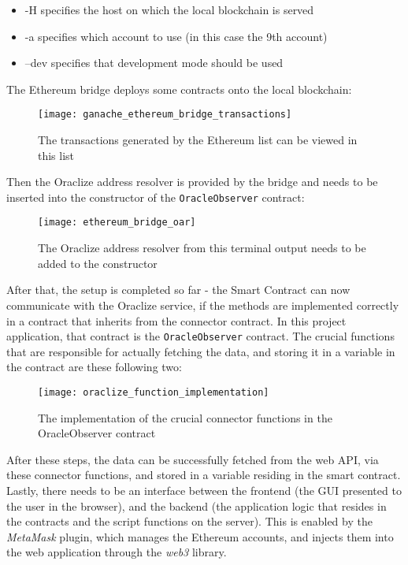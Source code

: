 \begin{itemize}
	\item -H specifies the host on which the local blockchain is served
	\item -a specifies which account to use (in this case the 9th account)
	\item --dev specifies that development mode should be used
\end{itemize}
The Ethereum bridge deploys some contracts onto the local blockchain:
\begin{figure}[H]
\centering
\texttt{[image: ganache\_ethereum\_bridge\_transactions]}
\caption{The transactions generated by the Ethereum list can be viewed in this list}
\end{figure}
Then the Oraclize address resolver is provided by the bridge and needs to be inserted into the constructor of the \texttt{OracleObserver} contract:
\begin{figure}[H]
\centering
\texttt{[image: ethereum\_bridge\_oar]}
\caption{The Oraclize address resolver from this terminal output needs to be added to the constructor}
\end{figure}
After that, the setup is completed so far - the Smart Contract can now communicate with the Oraclize service, if the methods are implemented correctly in a contract that inherits from the connector contract. In this project application, that contract is the \texttt{OracleObserver} contract. The crucial functions that are responsible for actually fetching the data, and storing it in a variable in the contract are these following two:
\begin{figure}[H]
\texttt{[image: oraclize\_function\_implementation]}
\caption{The implementation of the crucial connector functions in the OracleObserver contract}
\end{figure}
After these steps, the data can be successfully fetched from the web API, via these connector functions, and stored in a variable residing in the smart contract. Lastly, there needs to be an interface between the frontend (the GUI presented to the user in the browser), and the backend (the application logic that resides in the contracts and the script functions on the server). This is enabled by the \emph{MetaMask} plugin, which manages the Ethereum accounts, and injects them into the web application through the \emph{web3} library. 

